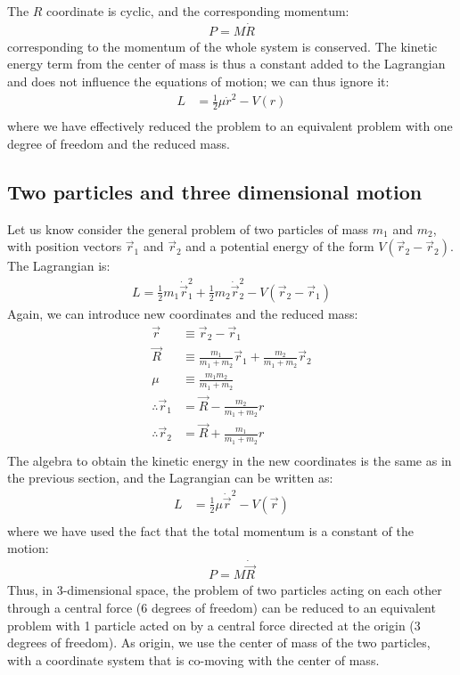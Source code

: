 The $R$ coordinate is cyclic, and the corresponding momentum:
\begin{align}
P=M\dot{R}
\end{align}
corresponding to the momentum of the whole system is conserved. The kinetic energy term from the center of mass is thus a constant added to the Lagrangian and does not influence the equations of motion; we can thus ignore it:
\begin{align}
L&=\frac{1}{2}\mu\dot{r}^2-V(r)\nonumber\\
\end{align}
where we have effectively reduced the problem to an equivalent problem with one degree of freedom and the reduced mass.

\subsection{Two particles and three dimensional motion}
Let us know consider the general problem of two particles of mass $m_1$ and $m_2$, with position vectors $\vec{r}_1$ and $\vec{r}_2$ and a potential energy of the form $V(\vec{r}_2-\vec{r}_2)$. The Lagrangian is:
\begin{align}
L=\frac{1}{2}m_1\dot{\vec{r}}_1^2+\frac{1}{2}m_2\dot{\vec{r}}_2^2-V(\vec{r}_2-\vec{r}_1)
\end{align}
Again, we can introduce new coordinates and the reduced mass:
\begin{align*}
\vec{r}&\equiv \vec{r}_2-\vec{r}_1\nonumber\\
\vec{R}&\equiv \frac{m_1}{m_1+m_2}\vec{r}_1+\frac{m_2}{m_1+m_2}\vec{r}_2\nonumber\\
\mu&\equiv \frac{m_1m_2}{m_1+m_2}\nonumber\\
\therefore \vec{r}_1&=\vec{R}-\frac{m_2}{m_1+m_2}r\nonumber\\
\therefore \vec{r}_2&=\vec{R}+\frac{m_1}{m_1+m_2}r\nonumber\\
\end{align*}
The algebra to obtain the kinetic energy in the new coordinates is the same as in the previous section, and the Lagrangian can be written as:
\begin{align}
L&=\frac{1}{2}\mu\dot{\vec{r}}^2-V(\vec{r})\nonumber\\
\end{align}
where we have used the fact that the total momentum is a constant of the motion:
\begin{align}
P=M\dot{\vec{R}}
\end{align}
Thus, in 3-dimensional space, the problem of two particles acting on each other through a central force (6 degrees of freedom) can be reduced to an equivalent problem with 1 particle acted on by a  central force directed at the origin (3 degrees of freedom). As origin, we use the center of mass of the two particles, with a coordinate system that is co-moving with the center of mass.

